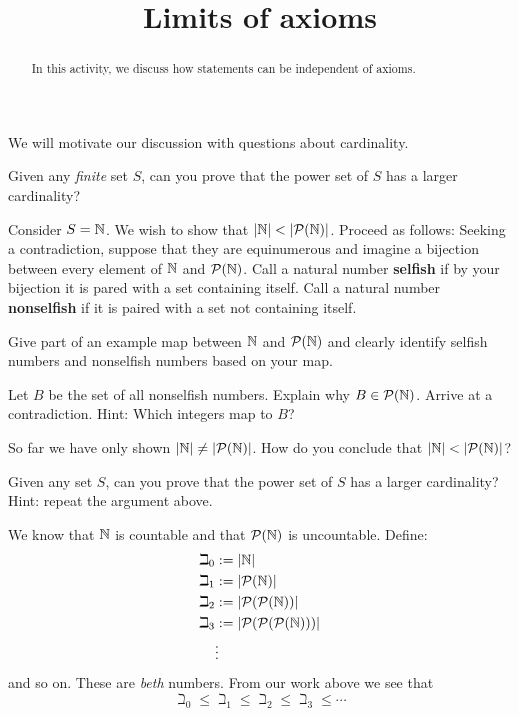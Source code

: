 \documentclass{ximera}
\title{Limits of axioms}
\begin{document}
\begin{abstract}
In this activity, we discuss how statements can be independent of axioms.
\end{abstract}
\maketitle 

We will motivate our discussion with questions about cardinality.

\begin{question}
Given any \textit{finite} set $S$, can you prove that the power set of
$S$ has a larger cardinality?
\end{question}

Consider $S=\mathbb N$. We wish to show that $|\N|<|\P(\N)|$. Proceed as
follows: Seeking a contradiction, suppose that they are equinumerous
and imagine a bijection between every element of $\mathbb N$ and
$\mathcal{P}(\mathbb N)$. Call a natural number \textbf{selfish} if by your bijection
it is pared with a set containing itself. Call a natural number
\textbf{nonselfish} if it is paired with a set not containing itself.

\begin{question}
Give part of an example map between $\mathbb N$ and $\mathcal{P}(\mathbb N)$ and clearly
identify selfish numbers and nonselfish numbers based on your map.
\end{question}

\begin{question}
Let $B$ be the set of all nonselfish numbers. Explain why
$B\in\mathcal{P}(\mathbb N)$. Arrive at a contradiction. Hint: Which
integers map to $B$?
\end{question}


\begin{question}
So far we have only shown $|\mathbb N|\ne|\mathcal{P}(\mathbb N)|$. How do you conclude that
$|\N|<|\P(\N)|$?
\end{question}

\begin{question}
Given any set $S$, can you prove that the power set of $S$ has a
larger cardinality? Hint: repeat the argument above.
\end{question}



We know that $\mathbb N$ is countable and that $\mathcal{P}(\mathbb N)$ is uncountable. Define:
\begin{align*}
\beth_0 &:=|\mathbb N|\\
\beth_1 &:=|\mathcal{P}(\mathbb N)|\\
\beth_2 &:=|\mathcal{P}(\mathcal{P}(\mathbb N))|\\
\beth_3 &:=|\mathcal{P}(\mathcal{P}(\mathcal{P}(\mathbb N)))|\\
        &\vdots
\end{align*}
and so on. These are \textit{beth} numbers. From our work above we see that 
\[
\beth_0 \le \beth_1 \le \beth_2 \le \beth_3 \le \cdots
\]
\end{document}
